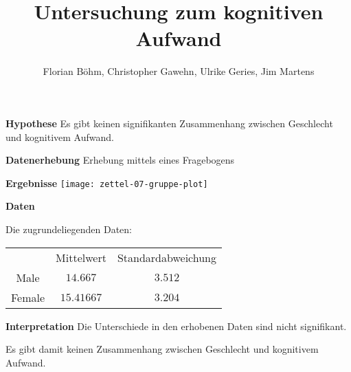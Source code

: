 \documentclass[14pt]{beamer}
\begin{document}
\author{Florian Böhm, Christopher Gawehn, Ulrike Geries, Jim Martens}
\title{\bfseries \color{black}Untersuchung zum kognitiven Aufwand}

\renewcommand{\figurename}{Figure}

\begin{frame}
	\titlepage
\end{frame}

\begin{frame}{\bfseries \color{black}Hypothese}
	Es gibt keinen signifikanten Zusammenhang zwischen Geschlecht und kognitivem Aufwand.
\end{frame}

\begin{frame}{\bfseries \color{black}Datenerhebung}
	Erhebung mittels eines Fragebogens
\end{frame}

\begin{frame}{\bfseries \color{black}Ergebnisse}
	\centering
	\texttt{[image: zettel-07-gruppe-plot]}
\end{frame}

\begin{frame}{\bfseries \color{black}Daten}

Die zugrundeliegenden Daten:

\begin{tabular}{ccc}
	& Mittelwert & Standardabweichung \\
	Male & $14.667$ & $3.512$ \\
	Female & $15.41667$ & $3.204$
\end{tabular}
\end{frame}

\begin{frame}{\bfseries \color{black}Interpretation}
	Die Unterschiede in den erhobenen Daten sind nicht signifikant.
	
	Es gibt damit keinen Zusammenhang zwischen Geschlecht und kognitivem Aufwand.
\end{frame}
\end{document}
